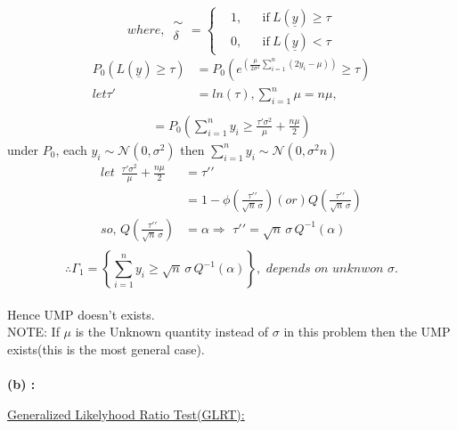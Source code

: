 \documentclass[a4paper,english,12pt]{article}
\begin{document}
 \begin{equation}
where,\,\substack{\sim \\ \delta}= \left \{
  \begin{aligned}
    &1, && \text{if}\ L(\underline{y})\geq\tau \\
    &0, && \text{if}\ L(\underline{y})<\tau 
  \end{aligned} \right.
\end{equation}
\begin{align*}
P_0(L(\underline{y})\geq\tau)&=P_0 (e^{\left( \frac{\mu}{2 \sigma^2}\sum\limits_{i=1}^n(2y_i-\mu)\right)} \geq \tau)\\
let \tau \prime &=ln(\tau),\sum\limits_{i=1}^n \mu = n \mu,\\
\end{align*}
\begin{align*}
=P_0 \left(\sum\limits_{i=1}^n y_i\geq\frac{\tau \prime \sigma^2}{\mu}+\frac{n\mu}{2}\right)
\end{align*}
under $P_0$, each $y_i \sim \mathcal{N}(0,\sigma^2)$ then $\sum\limits_{i=1}^ny_i \sim \mathcal{N}(0,\sigma^2 n)$\\
\begin{align*}
let \,\,\,\frac{\tau \prime \sigma^2}{\mu}+\frac{n\mu}{2}&=\tau \prime\prime \\
&=1-\phi\left(\frac{\tau \prime \prime}{\sqrt{n}\, \sigma}\right) (or) Q\left(\frac{\tau \prime \prime}{\sqrt{n}\, \sigma}\right)\\
so,\,Q\left(\frac{\tau \prime \prime}{\sqrt{n}\, \sigma}\right)&=\alpha\Rightarrow \,\, \tau \prime \prime=\sqrt{n}\,\sigma \, Q^{-1}(\alpha)\\
\end{align*}
$$\therefore \Gamma_1=\left \{ \sum\limits_{i=1}^n y_i\geq \sqrt{n}\,\sigma \, Q^{-1}(\alpha) \right \}, \,\, depends\,\, on\,\, unknwon \,\, \sigma.$$\\
Hence UMP doesn't exists.\\
NOTE: If $\mu$ is the Unknown quantity instead of $\sigma$ in this problem then the UMP exists(this is the most general case).\\
\\
\textbf{(b) : }\begin{Large}
\underline{Generalized Likelyhood Ratio Test(GLRT):}\\
\end{Large}
\end{document}
